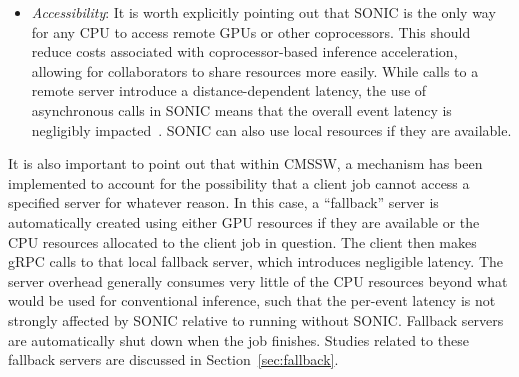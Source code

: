 \begin{itemize}
    \item \emph{Accessibility}: It is worth explicitly pointing out that SONIC is the only way for any CPU to access remote GPUs or other coprocessors. This should reduce costs associated with coprocessor-based inference acceleration, allowing for collaborators to share resources more easily. While calls to a remote server introduce a distance-dependent latency, the use of asynchronous calls in SONIC means that the overall event latency is negligibly impacted~\cite{Krupa:2020bwg}. SONIC can also use local resources if they are available.
\end{itemize}

It is also important to point out that within CMSSW, a mechanism has been implemented to account for the possibility that a client job cannot access a specified server for whatever reason. In this case, a ``fallback'' server is automatically created using either GPU resources if they are available or the CPU resources allocated to the client job in question. The client then makes gRPC calls to that local fallback server, which introduces negligible latency. The server overhead generally consumes very little of the CPU resources beyond what would be used for conventional inference, such that the per-event latency is not strongly affected by SONIC relative to running without SONIC. Fallback servers are automatically shut down when the job finishes. Studies related to these fallback servers are discussed in Section~\ref{sec:fallback}.
